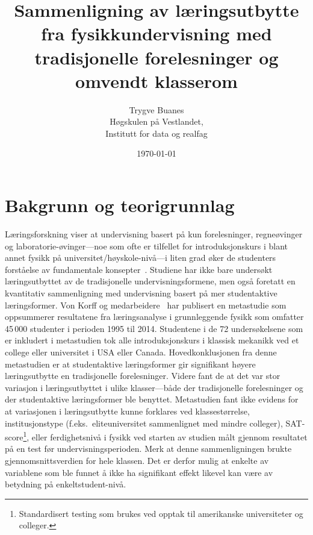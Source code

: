 \documentclass[a4paper,norsk,12pt]{article}
\title{Sammenligning av læringsutbytte fra fysikkundervisning med tradisjonelle forelesninger og omvendt klasserom}
\author{Trygve Buanes \vspace{-5mm} \\Høgskulen på Vestlandet, \vspace{-10mm} \\ Institutt for data og realfag \vspace{-5mm}}
\date{\today}
\begin{document}
\maketitle

\section{Bakgrunn og teorigrunnlag}
Læringsforskning viser at undervisning basert på kun forelesninger, regne\-øvinger og laboratorie-øvinger---noe som ofte er tilfellet for introduksjonskurs i blant annet fysikk på universitet/høyskole-nivå---i liten grad øker de studenters forståelse av fundamentale konsepter~\cite{doi:10.1119/1.14030, doi:10.1119/1.18809, doi:10.1119/1.18863}. Studiene har ikke bare undersøkt læringsutbyttet av de tradisjonelle undervisningsformene, men også foretatt en kvantitativ sammenligning med undervisning basert på mer student\-aktive læringsformer. Von Korff og medarbeidere~\cite{doi:10.1119/1.4964354} har publisert en metastudie som oppsummerer resultatene fra læringsanalyse i grunnleggende fysikk som omfatter 45\,000 studenter i perioden 1995 til 2014. Studentene i de 72 undersøkelsene som er inkludert i metastudien tok alle introduksjonskurs i klassisk mekanikk ved et college eller universitet i USA eller Canada. Hovedkonklusjonen fra denne metastudien er at studentaktive læringsformer gir signifikant høyere læringsutbytte en tradisjonelle forelesninger. Videre fant de at det var  stor variasjon i læringsutbyttet i ulike klasser---både der tradisjonelle forelesninger og der studentaktive læringsformer ble benyttet. Metastudien fant ikke evidens for at  variasjonen i læringsutbytte kunne forklares ved klassestørrelse, institusjonstype (f.eks.~eliteuniversitet sammenlignet med mindre colleger), SAT-score\footnote{Standardisert testing som brukes ved opptak til amerikanske universiteter og colleger.}, eller ferdighetsnivå i fysikk ved starten av studien målt gjennom resultatet på en test før undervisningsperioden. Merk at denne sammenligningen brukte gjennomsnittsverdien for hele klassen. Det er derfor mulig at enkelte av variablene som ble funnet å ikke ha signifikant effekt likevel kan være av betydning på enkeltstudent-nivå.
\end{document}
